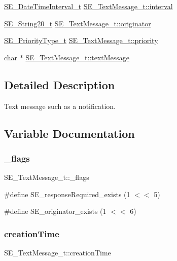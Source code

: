 \begin{DoxyCompactItemize}
\item 
\hyperlink{structSE__DateTimeInterval__t}{S\+E\+\_\+\+Date\+Time\+Interval\+\_\+t} \hyperlink{group__TextMessage_ga34dbbe164fb39086ab9ea1dc2cb993df}{S\+E\+\_\+\+Text\+Message\+\_\+t\+::interval}
\item 
\hyperlink{group__String20_gac62354528eb48096f8deab6e503a3193}{S\+E\+\_\+\+String20\+\_\+t} \hyperlink{group__TextMessage_ga926d4d6f8b8b3e8f5c39c0b391c17261}{S\+E\+\_\+\+Text\+Message\+\_\+t\+::originator}
\item 
\hyperlink{group__PriorityType_ga809c127a21bbe2efe64f393fa04be0c3}{S\+E\+\_\+\+Priority\+Type\+\_\+t} \hyperlink{group__TextMessage_gabaf18bd2a16c44de5f1c0be141c8d841}{S\+E\+\_\+\+Text\+Message\+\_\+t\+::priority}
\item 
char $\ast$ \hyperlink{group__TextMessage_ga681f5ae7a8773a4381420445c9ae75ec}{S\+E\+\_\+\+Text\+Message\+\_\+t\+::text\+Message}
\end{DoxyCompactItemize}


\subsection{Detailed Description}
Text message such as a notification. 

\subsection{Variable Documentation}
\mbox{\label{group__TextMessage_gaf629d5b9d66e6a1e00c8ffe32295eeef}} 
\subsubsection{\texorpdfstring{\+\_\+flags}{\_flags}}
{\footnotesize\ttfamily S\+E\+\_\+\+Text\+Message\+\_\+t\+::\+\_\+flags}

\#define S\+E\+\_\+response\+Required\+\_\+exists (1 $<$$<$ 5)

\#define S\+E\+\_\+originator\+\_\+exists (1 $<$$<$ 6) \mbox{\label{group__TextMessage_ga26ae5914787c481dbbf7052be2087a2c}} 
\subsubsection{\texorpdfstring{creation\+Time}{creationTime}}
{\footnotesize\ttfamily S\+E\+\_\+\+Text\+Message\+\_\+t\+::creation\+Time}

